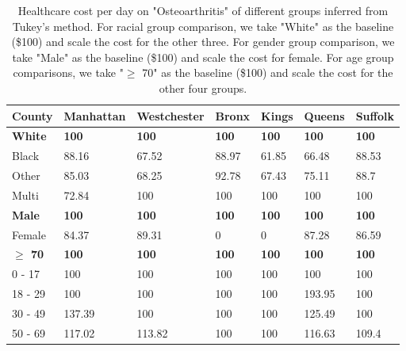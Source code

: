 \documentclass[10pt,twocolumn,letterpaper]{article}
\begin{document}
\begin{landscape}
\begin{table}[]
\small
\begin{center}
\label{tab:my-table}
\begin{tabular}{|l|l|l|l|l|l|l|}
\hline
\textbf{County} & \textbf{Manhattan} & \textbf{Westchester} & \textbf{Bronx} & \textbf{Kings} & \textbf{Queens} & \textbf{Suffolk} \\ \hline
\textbf{White} & \textbf{100} & \textbf{100} & \textbf{100} & \textbf{100} & \textbf{100} & \textbf{100} \\ \hline
Black & 88.16 & 67.52 & 88.97 & 61.85 & 66.48 & 88.53 \\ \hline
Other & 85.03 & 68.25 & 92.78 & 67.43 & 75.11 & 88.7 \\ \hline
Multi & 72.84 & 100 & 100 & 100 & 100 & 100 \\ \hline
\textbf{Male} & \textbf{100} & \textbf{100} & \textbf{100} & \textbf{100} & \textbf{100} & \textbf{100} \\ \hline
Female & 84.37 & 89.31 & 0 & 0 & 87.28 & 86.59 \\ \hline
\textbf{$\ge$ 70} & \textbf{100} & \textbf{100} & \textbf{100} & \textbf{100} & \textbf{100} & \textbf{100} \\ \hline
0 - 17 & 100 & 100 & 100 & 100 & 100 & 100 \\ \hline
18 - 29 & 100 & 100 & 100 & 100 & 193.95 & 100 \\ \hline
30 - 49 & 137.39 & 100 & 100 & 100 & 125.49 & 100 \\ \hline
50 - 69 & 117.02 & 113.82 & 100 & 100 & 116.63 & 109.4 \\ \hline
\end{tabular}
\end{center}
\caption{Healthcare cost per day on "Osteoarthritis" of different groups inferred from Tukey's method. For racial group comparison, we take "White" as the baseline (\$100) and scale the cost for the other three. For gender group comparison, we take "Male" as the baseline (\$100) and scale the cost for female. For age group comparisons, we take "$\ge$ 70" as the baseline (\$100) and scale the cost for the other four groups. }
\end{table}
\end{landscape}


\iffalse
\end{document}
